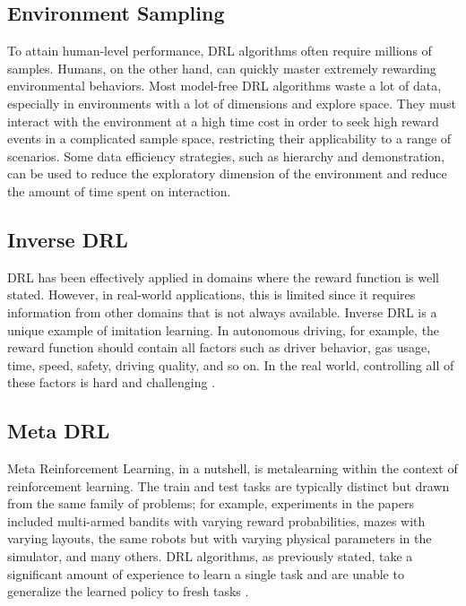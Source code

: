 \documentclass{article}
\begin{document}
\subsection{Environment Sampling}
To attain human-level performance, DRL algorithms often
require millions of samples. Humans, on the other hand, can
quickly master extremely rewarding environmental behaviors.
Most model-free DRL algorithms waste a lot of data, especially
in environments with a lot of dimensions and explore space.
They must interact with the environment at a high time cost in
order to seek high reward events in a complicated sample space,
restricting their applicability to a range of scenarios. Some data
efficiency strategies, such as hierarchy and demonstration, can
be used to reduce the exploratory dimension of the environment
and reduce the amount of time spent on interaction. 

\subsection{Inverse DRL}
DRL has been effectively applied in domains where the
reward function is well stated. However, in real-world
applications, this is limited since it requires information from
other domains that is not always available. Inverse DRL is a
unique example of imitation learning. In autonomous driving,
for example, the reward function should contain all factors such
as driver behavior, gas usage, time, speed, safety, driving
quality, and so on. In the real world, controlling all of these
factors is hard and challenging \cite{chen2021generative}. 

\subsection{Meta DRL}
Meta Reinforcement Learning, in a nutshell, is metalearning within the context of reinforcement learning. The train
and test tasks are typically distinct but drawn from the same
family of problems; for example, experiments in the papers
included multi-armed bandits with varying reward
probabilities, mazes with varying layouts, the same robots but
with varying physical parameters in the simulator, and many
others. DRL algorithms, as previously stated, take a significant
amount of experience to learn a single task and are unable to
generalize the learned policy to fresh tasks \cite{qu2021dmro}. 
\end{document}
